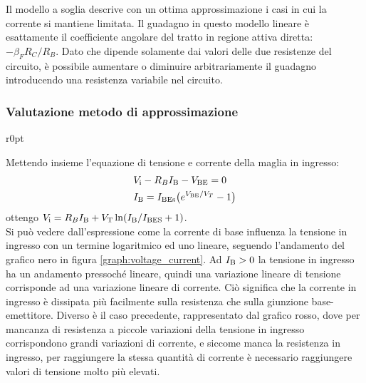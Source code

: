 \documentclass[../elettronica]{subfiles}
\begin{document}
\noindent
Il modello a soglia descrive con un ottima approssimazione i casi in cui la corrente si mantiene limitata.
Il guadagno in questo modello lineare è esattamente il coefficiente angolare del tratto in regione attiva diretta: $-\beta_F R_C / R_B$.
Dato che dipende solamente dai valori delle due resistenze del circuito, è possibile aumentare o diminuire arbitrariamente il
guadagno introducendo una resistenza variabile nel circuito.
\subsubsection{Valutazione metodo di approssimazione}
\begin{wrapfigure}{r}{0pt}
    \caption{test}
    \label{graph:voltage_current}
\end{wrapfigure}
Mettendo insieme l'equazione di tensione e corrente della maglia in ingresso:
\begin{align*}
    &\vi - R_B \I{B} - \vbe = 0\\
    &\I{B} = \diodecurrent[\I{BEs}]{\vbe}
\end{align*}
ottengo $\vi = R_B \I{B} + \V{T} \ln(\I{B} / \I{BES} + 1)$.
\\
Si può vedere dall'espressione come la corrente di base influenza la tensione
in ingresso con un termine logaritmico ed uno lineare,
seguendo l'andamento del grafico nero in figura \ref{graph:voltage_current}.
Ad $\I{B} > 0$ la tensione in ingresso ha un andamento pressoché lineare, quindi
una variazione lineare di tensione corrisponde ad una variazione lineare di corrente.
Ciò significa che la corrente in ingresso è dissipata più facilmente sulla resistenza
che sulla giunzione base-emettitore.
Diverso è il caso precedente, rappresentato dal grafico rosso, dove per mancanza di
resistenza a piccole variazioni della tensione in ingresso corrispondono grandi variazioni
di corrente, e siccome manca la resistenza in ingresso, per raggiungere la stessa
quantità di corrente è necessario raggiungere valori di tensione molto più elevati.

\end{document}
